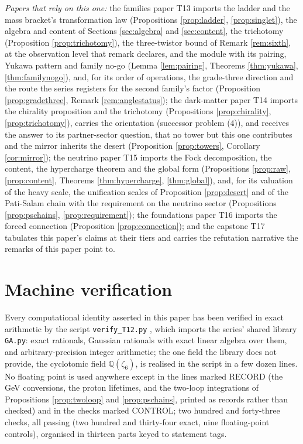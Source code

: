 \documentclass[11pt]{article}
\theoremstyle{definition}
\begin{document}
\emph{Papers that rely on this one:} the families paper T13 \cite{ButlerT13} imports the ladder and the mass bracket's transformation law (Propositions \ref{prop:ladder}, \ref{prop:singlet}), the algebra and content of Sections \ref{sec:algebra} and \ref{sec:content}, the trichotomy (Proposition \ref{prop:trichotomy}), the three-twistor bound of Remark \ref{rem:sixth}, at the observation level that remark declares, and the module with its pairing, Yukawa pattern and family no-go (Lemma \ref{lem:pairing}, Theorems \ref{thm:yukawa}, \ref{thm:familynogo}), and, for its order of operations, the grade-three direction and the route the series registers for the second family's factor (Proposition \ref{prop:gradethree}, Remark \ref{rem:anglestatus}); the dark-matter paper T14 \cite{ButlerT14} imports the chirality proposition and the trichotomy (Propositions \ref{prop:chirality}, \ref{prop:trichotomy}), carries the orientation (successor problem (4)), and receives the answer to its partner-sector question, that no tower but this one contributes and the mirror inherits the desert (Proposition \ref{prop:towers}, Corollary \ref{cor:mirror}); the neutrino paper T15 \cite{ButlerT15} imports the Fock decomposition, the content, the hypercharge theorem and the global form (Propositions \ref{prop:raw}, \ref{prop:content}, Theorems \ref{thm:hypercharge}, \ref{thm:global}), and, for its valuation of the heavy scale, the unification scales of Proposition \ref{prop:desert} and of the Pati-Salam chain with the requirement on the neutrino sector (Propositions \ref{prop:pschains}, \ref{prop:requirement}); the foundations paper T16 \cite{ButlerT16} imports the forced connection (Proposition \ref{prop:connection}); and the capstone T17 \cite{ButlerT17} tabulates this paper's claims at their tiers and carries the refutation narrative the remarks of this paper point to.

\section{Machine verification}\label{sec:verification}

Every computational identity asserted in this paper has been verified in exact arithmetic by the script \texttt{verify\_T12.py} \cite{ButlerVerifyT12}, which imports the series' shared library \texttt{GA.py}: exact rationals, Gaussian rationals with exact linear algebra over them, and arbitrary-precision integer arithmetic; the one field the library does not provide, the cyclotomic field $\mathbb{Q}(\zeta_{6})$, is realised in the script in a few dozen lines. No floating point is used anywhere except in the lines marked RECORD (the GeV conversions, the proton lifetimes, and the two-loop integrations of Propositions \ref{prop:twoloop} and \ref{prop:pschains}, printed as records rather than checked) and in the checks marked CONTROL; two hundred and forty-three checks, all passing (two hundred and thirty-four exact, nine floating-point controls), organised in thirteen parts keyed to statement tags.
\end{document}
